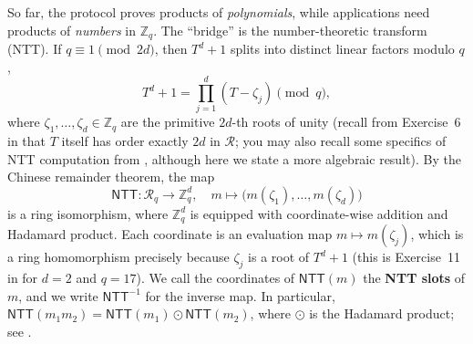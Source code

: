 \documentclass[../../book.tex]{subfiles}
\begin{document}
So far, the protocol proves products of \emph{polynomials}, while applications need products of \emph{numbers} in $\mathbb{Z}_q$.
The ``bridge'' is the number-theoretic transform (NTT).
If $q \equiv 1 \pmod{2d}$, then $T^d+1$ splits into distinct linear factors modulo $q$,
\begin{equation*}
    T^d + 1 = \prod_{j=1}^{d}(T - \zeta_j) \pmod q,
\end{equation*}
where $\zeta_1, \dots, \zeta_d \in \mathbb{Z}_q$ are the primitive $2d$-th roots of unity (recall from Exercise~6 in  that $T$ itself has order exactly $2d$ in $\mathcal{R}$; you may also recall some specifics of NTT computation from , although here we state a more algebraic result).
By the Chinese remainder theorem, the map
\begin{equation*}
    \mathsf{NTT}: \mathcal{R}_q \to \mathbb{Z}_q^d, \quad m \mapsto \bigl(m(\zeta_1), \dots, m(\zeta_d)\bigr)
\end{equation*}
is a ring isomorphism, where $\mathbb{Z}_q^d$ is equipped with coordinate-wise addition and Hadamard product.
Each coordinate is an evaluation map $m \mapsto m(\zeta_j)$, which is a ring homomorphism precisely because $\zeta_j$ is a root of $T^d+1$ (this is Exercise~11 in  for $d = 2$ and $q = 17$).
We call the coordinates of $\mathsf{NTT}(m)$ the \textbf{NTT slots} of $m$, and we write $\mathsf{NTT}^{-1}$ for the inverse map.
In particular, $\mathsf{NTT}(m_1m_2) = \mathsf{NTT}(m_1) \odot \mathsf{NTT}(m_2)$, where $\odot$ is the Hadamard product; see .
\end{document}
